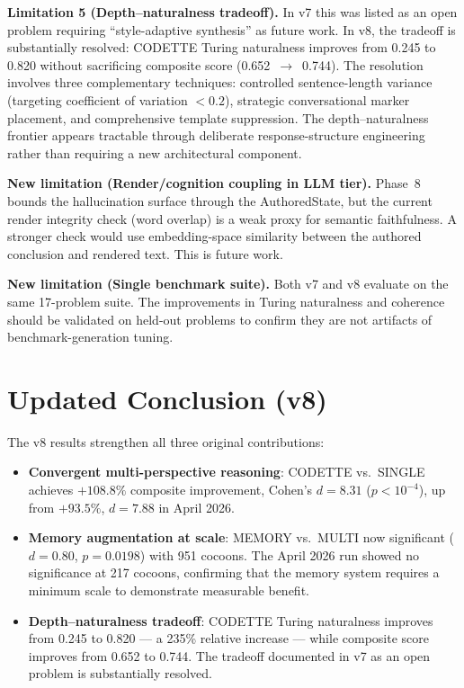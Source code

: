 \documentclass[11pt,a4paper]{article}
\begin{document}
\textbf{Limitation 5 (Depth--naturalness tradeoff).} In v7 this was listed as
an open problem requiring ``style-adaptive synthesis'' as future work. In v8,
the tradeoff is substantially resolved: CODETTE Turing naturalness improves
from 0.245 to 0.820 without sacrificing composite score (0.652~$\to$~0.744).
The resolution involves three complementary techniques: controlled
sentence-length variance (targeting coefficient of variation $< 0.2$),
strategic conversational marker placement, and comprehensive template
suppression. The depth--naturalness frontier appears tractable through
deliberate response-structure engineering rather than requiring a new
architectural component.

\textbf{New limitation (Render/cognition coupling in LLM tier).} Phase~8
bounds the hallucination surface through the AuthoredState, but the current
render integrity check (word overlap) is a weak proxy for semantic
faithfulness. A stronger check would use embedding-space similarity between
the authored conclusion and rendered text. This is future work.

\textbf{New limitation (Single benchmark suite).} Both v7 and v8 evaluate
on the same 17-problem suite. The improvements in Turing naturalness and
coherence should be validated on held-out problems to confirm they are not
artifacts of benchmark-generation tuning.

\section{Updated Conclusion (v8)}
\label{sec:conclusion-v8}

The v8 results strengthen all three original contributions:

\begin{itemize}[nosep]
  \item \textbf{Convergent multi-perspective reasoning}: CODETTE vs.\ SINGLE
    achieves $+108.8\%$ composite improvement, Cohen's $d=8.31$
    ($p < 10^{-4}$), up from $+93.5\%$, $d=7.88$ in April 2026.
  \item \textbf{Memory augmentation at scale}: MEMORY vs.\ MULTI now
    significant ($d=0.80$, $p=0.0198$) with 951 cocoons. The April 2026 run
    showed no significance at 217 cocoons, confirming that the memory
    system requires a minimum scale to demonstrate measurable benefit.
  \item \textbf{Depth--naturalness tradeoff}: CODETTE Turing naturalness
    improves from 0.245 to 0.820 --- a 235\% relative increase --- while
    composite score improves from 0.652 to 0.744. The tradeoff documented
    in v7 as an open problem is substantially resolved.
\end{itemize}
\end{document}
